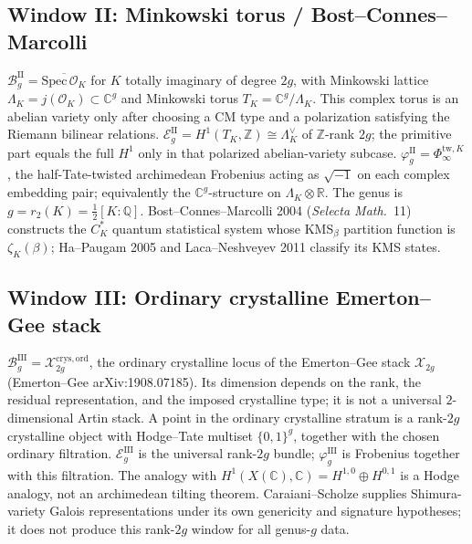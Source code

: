 \subsection{Window II: Minkowski torus / Bost--Connes--Marcolli}
\label{v4-arith:ag:w2-minkowski}

\(\mathcal{B}_g^{\mathrm{II}}=\overline{\mathrm{Spec}\,\mathcal{O}_K}\) for
\(K\) totally imaginary of degree \(2g\), with Minkowski lattice
\(\Lambda_K=j(\mathcal{O}_K)\subset\mathbb{C}^g\) and Minkowski torus
\(T_K=\mathbb{C}^g/\Lambda_K\). This complex torus is an abelian
variety only after choosing a CM type and a polarization satisfying
the Riemann bilinear relations. \(\mathcal{E}_g^{\mathrm{II}}=
H^{1}(T_K,\mathbb{Z})\cong\Lambda_K^\vee\) of \(\mathbb{Z}\)-rank \(2g\);
the primitive part equals the full \(H^1\) only in that polarized
abelian-variety subcase.
\(\varphi_g^{\mathrm{II}}=\Phi_\infty^{\mathrm{tw},K}\), the half-Tate-twisted
archimedean Frobenius acting as \(\sqrt{-1}\) on each complex embedding
pair; equivalently the \(\mathbb{C}^g\)-structure on \(\Lambda_K\otimes\mathbb{R}\).
The genus is \(g=r_2(K)=\tfrac{1}{2}[K:\mathbb{Q}]\).
Bost--Connes--Marcolli 2004 (\emph{Selecta Math.}~11) constructs the
\(C^*_K\) quantum statistical system whose KMS\(_\beta\) partition function
is \(\zeta_K(\beta)\); Ha--Paugam 2005 and Laca--Neshveyev 2011 classify
its KMS states.

\subsection{Window III: Ordinary crystalline Emerton--Gee stack}
\label{v4-arith:ag:w3-fargues-scholze}

\(\mathcal{B}_g^{\mathrm{III}}=\mathcal{X}_{2g}^{\mathrm{crys,ord}}\), the
ordinary crystalline locus of the Emerton--Gee stack \(\mathcal{X}_{2g}\)
(Emerton--Gee arXiv:1908.07185). Its dimension depends on the rank,
the residual representation, and the imposed crystalline type; it is
not a universal \(2\)-dimensional Artin stack. A point in the ordinary
crystalline stratum is a rank-\(2g\) crystalline object with Hodge--Tate
multiset \(\{0,1\}^{g}\), together with the chosen ordinary filtration.
\(\mathcal{E}_g^{\mathrm{III}}\) is the universal rank-\(2g\) bundle;
\(\varphi_g^{\mathrm{III}}\) is Frobenius together with this filtration.
The analogy with \(H^1(X(\mathbb{C}),\mathbb{C})=H^{1,0}\oplus H^{0,1}\)
is a Hodge analogy, not an archimedean tilting theorem.
Caraiani--Scholze supplies Shimura-variety Galois representations under
its own genericity and signature hypotheses; it does not produce this
rank-\(2g\) window for all genus-\(g\) data.

